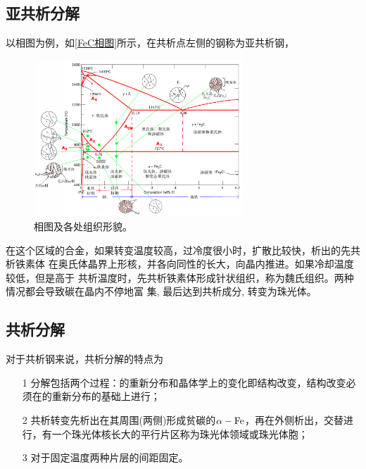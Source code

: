         \subsection{亚共析分解}
            以相图为例，如\autoref{FeC相图}所示，在共析点左侧的钢称为亚共析钢，
            \begin{figure}[ht]
                \centering
                \includegraphics[width=0.7\textwidth]{fig/Fe-C.jpg}
                \caption{相图及各处组织形貌。}
                \label{FeC相图}
            \end{figure}

            在这个区域的合金，如果转变温度较高，过冷度很小时，扩散比较快，析出的先共析铁素体
            在奥氏体晶界上形核，并各向同性的长大，向晶内推进。如果冷却温度较低，但是高于
            共析温度时，先共析铁素体形成针状组织，称为魏氏组织。两种情况都会导致碳在晶内不停地富
            集, 最后达到共析成分, 转变为珠光体。
        \subsection{共析分解}
            对于共析钢来说，共析分解的特点为
            \begin{itemize}
                \item[1] 分解包括两个过程：的重新分布和晶体学上的变化即结构改变，结构改变必须在的重新分布的基础上进行；
                \item[2] 共析转变先析出在其周围(两侧)形成贫碳的$\alpha-\ce{Fe}$，再在外侧析出，交替进行，有一个珠光体核长大的平行片区称为珠光体领域或珠光体胞；
                \item[3] 对于固定温度两种片层的间距固定。
            \end{itemize}